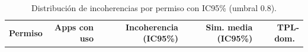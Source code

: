 \begin{table}[t]
\centering
\caption{Distribución de incoherencias por permiso con IC95\% (umbral 0.8).}
\small
\begin{tabular}{lrrrr}
\toprule
\textbf{Permiso} & \textbf{Apps con uso} & \textbf{Incoherencia (IC95\%)} & \textbf{Sim. media (IC95\%)} & \textbf{TPL-dom.}\
\midrule

\bottomrule
\end{tabular}
\end{table}
